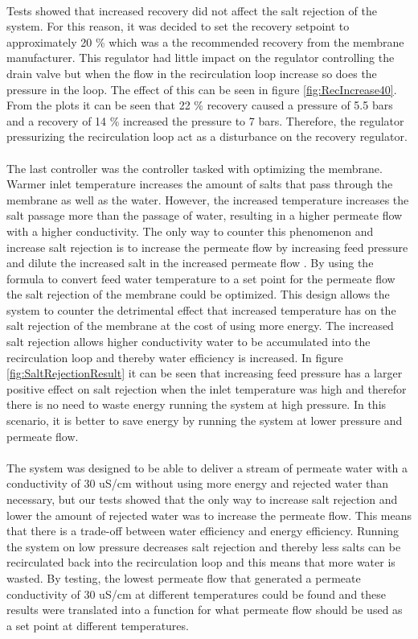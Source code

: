 \\
Tests showed that increased recovery did not affect the salt rejection of the system. For this reason, it was decided to set the recovery setpoint to approximately 20 \% which was a the recommended recovery from the membrane manufacturer. This regulator had little impact on the regulator controlling the drain valve but when the flow in the recirculation loop increase so does the pressure in the loop. The effect of this can be seen in figure \ref{fig:RecIncrease40}. From the plots it can be seen that 22 \% recovery caused a pressure of 5.5 bars and a recovery of 14 \% increased the pressure to 7 bars. Therefore, the regulator pressurizing the recirculation loop act as a disturbance on the recovery regulator.\\
\\
The last controller was the controller tasked with optimizing the membrane. Warmer inlet temperature increases the amount of salts that pass through the membrane as well as the water. However, the increased temperature increases the salt passage more than the passage of water, resulting in a higher permeate flow with a higher conductivity. The only way to counter this phenomenon and increase salt rejection is to increase the permeate flow by increasing feed pressure and dilute the increased salt in the increased permeate flow . By using the formula to convert feed water temperature to a set point for the permeate flow the salt rejection of the membrane could be optimized. This design allows the system to counter the detrimental effect that increased temperature has on the salt rejection of the membrane at the cost of using more energy. The increased salt rejection allows higher conductivity water to be accumulated into the recirculation loop and thereby water efficiency is increased. In figure \ref{fig:SaltRejectionResult} it can be seen that increasing feed pressure has a larger positive effect on salt rejection when the inlet temperature was high and therefor there is no need to waste energy running the system at high pressure. In this scenario, it is better to save energy by running the system at lower pressure and permeate flow. \\
\\
The system was designed to be able to deliver a stream of permeate water with a conductivity of 30 uS/cm without using more energy and rejected water than necessary, but our tests showed that the only way to increase salt rejection and lower the amount of rejected water was to increase the permeate flow. This means that there is a trade-off between water efficiency and energy efficiency. Running the system on low pressure decreases salt rejection and thereby less salts can be recirculated back into the recirculation loop and this means that more water is wasted. By testing, the lowest permeate flow that generated a permeate conductivity of 30 uS/cm at different temperatures could be found and these results were translated into a function for what permeate flow should be used as a set point at different temperatures. 

